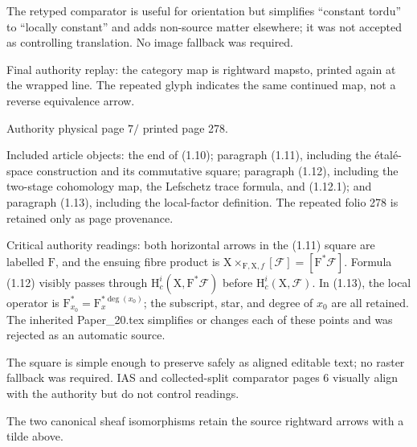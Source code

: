 \documentclass[10pt,leqno]{article}
\begin{document}
\noindent The retyped comparator is useful for orientation but simplifies “constant tordu” to “locally constant” and adds non-source matter elsewhere; it was not accepted as controlling translation. No image fallback was required.\par

\noindent Final authority replay: the category map is rightward mapsto, printed again at the wrapped line. The repeated glyph indicates the same continued map, not a reverse equivalence arrow.\par

\clearpage

\label{physical-7}\par\smallskip

\noindent Authority physical page \(7 /\) printed page 278.\par

\noindent Included article objects: the end of (1.10); paragraph (1.11), including the étalé-space construction and its commutative square; paragraph (1.12), including the two-stage cohomology map, the Lefschetz trace formula, and (1.12.1); and paragraph (1.13), including the local-factor definition. The repeated folio 278 is retained only as page provenance.\par

\noindent Critical authority readings: both horizontal arrows in the (1.11) square are labelled \(\mathrm{F}\), and the ensuing fibre product is \(\mathrm{X}\times _{\mathrm{F},\mathrm{X},f}[\mathcal{F} ]=[\mathrm{F}^{*}\mathcal{F} ]\). Formula (1.12) visibly passes through \(\mathrm{H}_{c}^{i}(\mathrm{X},\mathrm{F}^{*}\mathcal{F} )\) before \(\mathrm{H}_{c}^{i}(\mathrm{X},\mathcal{F} )\). In (1.13), the local operator is \(\mathrm{F}_{x_{0}}^{*}=\mathrm{F}_{x}^{*\operatorname{deg}(x_{0})}\); the subscript, star, and degree of \(x_{0}\) are all retained. The inherited Paper\_20.tex simplifies or changes each of these points and was rejected as an automatic source.\par

\noindent The square is simple enough to preserve safely as aligned editable text; no raster fallback was required. IAS and collected-split comparator pages 6 visually align with the authority but do not control readings.\par

\noindent The two canonical sheaf isomorphisms retain the source rightward arrows with a tilde above.\par
\end{document}
